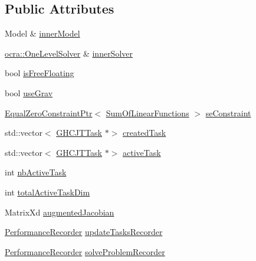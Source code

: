 \subsection*{Public Attributes}
\begin{DoxyCompactItemize}
\item 
Model \& \hyperlink{structgocra_1_1GHCJTController_1_1Pimpl_a43eb79ddf7ef332d76d850711fc57e8e}{inner\+Model}
\item 
\hyperlink{classocra_1_1OneLevelSolver}{ocra\+::\+One\+Level\+Solver} \& \hyperlink{structgocra_1_1GHCJTController_1_1Pimpl_af06224d9d2a704cb042b5b01d3bf18ab}{inner\+Solver}
\item 
bool \hyperlink{structgocra_1_1GHCJTController_1_1Pimpl_a04bbff0e011a7c0b2bff47c08ed32993}{is\+Free\+Floating}
\item 
bool \hyperlink{structgocra_1_1GHCJTController_1_1Pimpl_a0a9b1d16fc029929004e00dbf358063a}{use\+Grav}
\item 
\hyperlink{classocra_1_1EqualZeroConstraintPtr}{Equal\+Zero\+Constraint\+Ptr}$<$ \hyperlink{classocra_1_1SumOfLinearFunctions}{Sum\+Of\+Linear\+Functions} $>$ \hyperlink{structgocra_1_1GHCJTController_1_1Pimpl_abbc7f37d47e968b025652ade01739ab8}{se\+Constraint}
\item 
std\+::vector$<$ \hyperlink{classgocra_1_1GHCJTTask}{G\+H\+C\+J\+T\+Task} $\ast$$>$ \hyperlink{structgocra_1_1GHCJTController_1_1Pimpl_ae336064c9007227c37ec24f455b4cc39}{created\+Task}
\item 
std\+::vector$<$ \hyperlink{classgocra_1_1GHCJTTask}{G\+H\+C\+J\+T\+Task} $\ast$$>$ \hyperlink{structgocra_1_1GHCJTController_1_1Pimpl_a2322f7612c4ee994869b897d6546da97}{active\+Task}
\item 
int \hyperlink{structgocra_1_1GHCJTController_1_1Pimpl_acc8e0872a4a56af752e5556f8b5c83d5}{nb\+Active\+Task}
\item 
int \hyperlink{structgocra_1_1GHCJTController_1_1Pimpl_a9814826f2b30accde751b9f343b3590b}{total\+Active\+Task\+Dim}
\item 
Matrix\+Xd \hyperlink{structgocra_1_1GHCJTController_1_1Pimpl_a9ebc2b951dfa979568dfe12a36124424}{augmented\+Jacobian}
\item 
\hyperlink{classgocra_1_1PerformanceRecorder}{Performance\+Recorder} \hyperlink{structgocra_1_1GHCJTController_1_1Pimpl_a7305b9fe096cfd38ba50af0797484a6a}{update\+Tasks\+Recorder}
\item 
\hyperlink{classgocra_1_1PerformanceRecorder}{Performance\+Recorder} \hyperlink{structgocra_1_1GHCJTController_1_1Pimpl_a949ca96a7b5a333e0594c6e6eda106a1}{solve\+Problem\+Recorder}
\end{DoxyCompactItemize}


